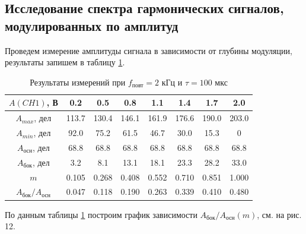 \documentclass[a4paper,14pt]{article}
\begin{document}
\subsection*{Исследование спектра гармонических сигналов, модулированных по амплитуд}


Проведем измерение амплитуды сигнала в зависимости от глубины модуляции, результаты запишем в таблицу \ref{tab7}.

\begin{table}[hbt!]
	\begin{center}
	\begin{tabular}{|c|c|c|c|c|c|c|c|} \hline
		$A(CH1)$, В	&0.2&	0.5&	0.8&	1.1&	1.4&	1.7&	2.0 \\ \hline
		$A_{max}$, дел	&113.7	&130.4	&146.1	&161.9&	176.6&	190.0	&203.0\\ \hline
		$A_{min}$, дел	&92.0	&75.2&	61.5	&46.7&	30.0	&15.3&	0\\ \hline
		$A_{\text{осн}}$, дел	&68.8	&68.8&	68.8&	68.8&	68.8&	68.8&	68.8\\ \hline
		$A_{\text{бок}}$, дел	&3.2	&8.1&	13.1&	18.1&	23.3&	28.2&	33.0\\ \hline
		$m$	&0.105	&0.268	&0.408	&0.552	&0.710&	0.851	&1.000\\ \hline
		$A_{\text{бок}}/A_{\text{осн}}$	&0.047	&0.118	&0.190&	0.263&	0.339	&0.410	&0.480\\ \hline
	\end{tabular}
\caption{Результаты измерений при $f_\text{повт} = 2$ кГц  и $\tau = 100$ мкс}
\label{tab7}
\end{center}
\end{table}

По данным таблицы \ref{tab7} построим график зависимости $A_{\text{бок}}/A_{\text{осн}}(m)$, см. на рис. 12.
\end{document}

